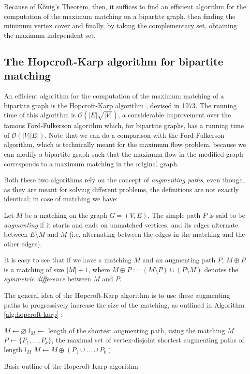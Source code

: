Because of K\H{o}nig's Theorem, then, it suffices to find an efficient algorithm for the computation of the maximum matching on a bipartite graph, then finding the minimum vertex cover and finally, by taking the complementary set, obtaining the maximum independent set.


\subsection{The Hopcroft-Karp algorithm for bipartite matching}

An efficient algorithm for the computation of the maximum matching of a bipartite graph is the Hopcroft-Karp algorithm \cite{hopcroft_karp}, devised in 1973. The running time of this algorithm is $\mathcal{O}\left( |E|\sqrt{|V|} \right)$, a considerable improvement over the famous Ford-Fulkerson algorithm which, for bipartite graphs, has a running time of $\mathcal{O}\left( |V||E| \right)$. Note that we can do a comparison with the Ford-Fulkerson algorithm, which is technically meant for the maximum flow problem, because we can modify a bipartite graph such that the maximum flow in the modified graph corresponds to a maximum matching in the original graph. 

Both these two algorithms rely on the concept of \emph{augmenting paths}, even though, as they are meant for solving different problems, the definitions are not exactly identical; in case of matching we have:

\begin{definition}
	Let $M$ be a matching on the graph $G=(V,E)$. The simple path $P$ is said to be \emph{augmenting} if it starts and ends on unmatched vertices, and its edges alternate between $E \setminus M$ and $M$ (i.e. alternating between the edges in the matching and the other edges).
\end{definition}

It is easy to see that if we have a matching $M$ and an augmenting path $P$, $M \oplus P$ is a matching of size $|M|+1$, where $M \oplus P := (M \setminus P) \cup (P \setminus M)$ denotes the \emph{symmetric difference} between $M$ and $P$. 

The general idea of the Hopcroft-Karp algorithm is to use these augmenting paths to progressively increase the size of the matching, as outlined in Algorithm \ref{alg:hopcroft-karp} \cite{hopcroft_karp}:

\begin{algorithm}[h]
	\begin{algorithmic}
		\State $M \gets \varnothing$
		\Repeat
		\State $l_M \gets$ length of the shortest augmenting path, using the matching $M$
		\State $P \gets \{ P_1,\dots,P_k \}$, the maximal set of vertex-disjoint shortest augmenting paths of length $l_M$
		\State $M \gets M \oplus (P_1 \cup \dots \cup P_k )$
	\end{algorithmic}
	\caption{Basic outline of the Hopcroft-Karp algorithm} \label{alg:hopcroft-karp}
\end{algorithm}

